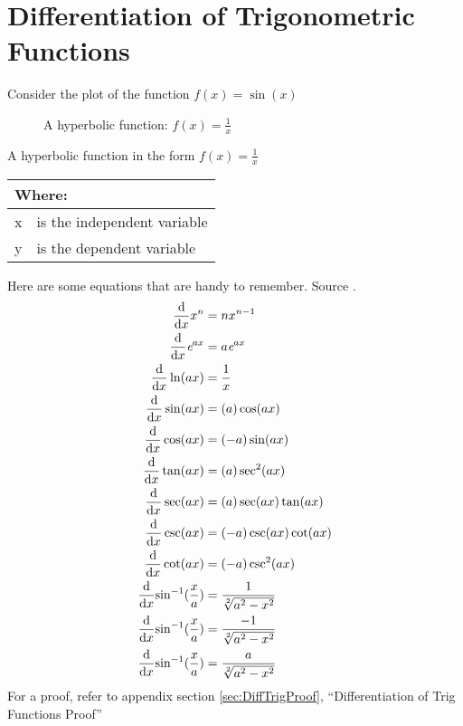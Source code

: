 \chapter{Differentiation of Trigonometric Functions}
\label{chap:DifferentiationOfTrigFunctions}
Consider the plot of the function $f(x) = \sin(x)$
\begin{figure}[!htb]
\label{fig:GraphTemplate}
\caption{A hyperbolic function: $f(x) = \frac{1}{x}$}
\end{figure}
A hyperbolic function in the form $ f(x) = \frac{1}{x}$
\begin{table}[!hbt]
\label{tab:GraphTemplateParts}
\begin{tabularx}{\linewidth}{| l X |}
  \hline
  \multicolumn{2}{|l|}{Where:} \\
  \hline \hline
  x & is the independent variable\\
  y & is the dependent variable\\
\hline
\end{tabularx}
\end{table}
%
Here are some equations that are handy to remember. Source \cite{RHBDiffQuickStart}.
\begin{align}
  \frac{\mathrm{d}}{\mathrm{d}x} {x}^{n} & = n{x}^{n-1} \\
  \frac{\mathrm{d}}{\mathrm{d}x} {\emph{e}}^{ax} & = a{\emph{e}}^{ax} \\
  \frac{\mathrm{d}}{\mathrm{d}x} \ln(ax) & = \frac{1}{x} \\
  \frac{\mathrm{d}}{\mathrm{d}x} \sin(ax) & = (a)\cos(ax) \\
  \frac{\mathrm{d}}{\mathrm{d}x} \cos(ax) & = (-a)\sin(ax) \\
  \frac{\mathrm{d}}{\mathrm{d}x} \tan(ax) & = (a)\sec^2(ax) \\
  \frac{\mathrm{d}}{\mathrm{d}x} \sec(ax) & = (a)\sec(ax)\tan(ax) \\
  \frac{\mathrm{d}}{\mathrm{d}x} \csc(ax) & = (-a)\csc(ax)\cot(ax) \\
  \frac{\mathrm{d}}{\mathrm{d}x} \cot(ax) & = (-a)\csc^2(ax) \\
  \frac{\mathrm{d}}{\mathrm{d}x}{\sin}^{-1}(\frac{x}{a}) & = \frac{1}{\sqrt[2]{{a}^{2} - {x}^{2}}}
  \\
  \frac{\mathrm{d}}{\mathrm{d}x}{\sin}^{-1}(\frac{x}{a}) & = \frac{-1}{\sqrt[2]{{a}^{2} -
  {x}^{2}}}
  \\
  \frac{\mathrm{d}}{\mathrm{d}x}{\sin}^{-1}(\frac{x}{a}) & = \frac{a}{\sqrt[2]{{a}^{2} - {x}^{2}}}  
\end{align}
For a proof, refer to appendix section \ref{sec:DiffTrigProof},
``Differentiation of Trig Functions Proof''